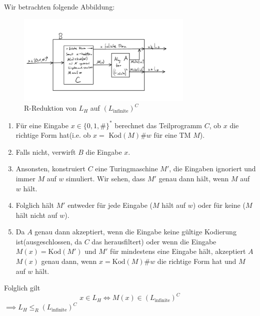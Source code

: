 \documentclass[a4paper, 11pt]{article}
\begin{document}
                    Wir betrachten folgende Abbildung:
                    
                    \begin{figure}[htp]
                        \centering
                        \includegraphics[width=0.75\textwidth]{Images/18b_Zeichnung.png}
                        \caption{R-Reduktion von $L_H$ auf $(L_{\text{infinite}})^C$}
                    \end{figure}
                
                
                    \begin{enumerate}[label=\Roman*.]
                        \item Für eine Eingabe $x \in \{0,1,\#\}^*$ berechnet das Teilprogramm $C$, ob $x$ die richtige Form hat(i.e. ob $x = $ Kod$(M)\#w$ für eine TM $M$).
                        \item Falls nicht, verwirft $B$ die Eingabe $x$.
                        
                        \item Ansonsten, konstruiert $C$ eine Turingmaschine $M'$, die Eingaben ignoriert und immer $M$ auf $w$ simuliert. Wir sehen, dass $M'$ genau dann hält, wenn $M$ auf $w$ hält. 
                        \item Folglich hält $M'$ entweder für jede Eingabe ($M$ hält auf $w$) oder für keine ($M$ hält nicht auf $w$).
                         
                        \item Da $A$ genau dann akzeptiert, wenn die Eingabe keine gültige Kodierung ist(ausgeschlossen, da $C$ das herausfiltert) oder wenn die Eingabe $M(x)= \text{Kod}(M')$ und $M'$ für mindestens eine Eingabe hält, akzeptiert $A$ $M(x)$ genau dann, wenn $x = \text{Kod}(M)\#w$ die richtige Form hat und $M$ auf $w$ hält.
                    \end{enumerate}
                    
                    
                    Folglich gilt $$x \in L_H \iff M(x) \in (L_{\text{infinite}})^C$$
                    $\implies L_H \leq_R (L_{\text{infinite}})^C$ 
                
\end{document}
